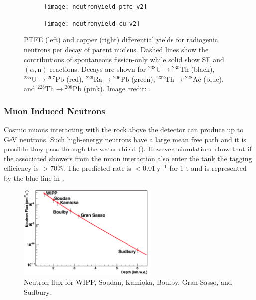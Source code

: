 \begin{figure}
    \centering
    \begin{subfigure}[t]{0.5\textwidth}
        \centering
        \texttt{[image: neutronyield-ptfe-v2]}
    \end{subfigure}%
    \begin{subfigure}[t]{0.5\textwidth}
        \centering
        \texttt{[image: neutronyield-cu-v2]}
    \end{subfigure}
    \caption{PTFE (left) and copper (right) differential yields for radiogenic neutrons per decay of parent nucleus.  Dashed lines show
    the contributions of spontaneous fission-only while solid show SF and $(\alpha, \mathrm{n})$ reactions.  Decays are shown
    for $\mathrm{^{238}U} \rightarrow \mathrm{^{230}Th}$ (black), $\mathrm{^{235}U} \rightarrow \mathrm{^{207}Pb}$ (red),
    $\mathrm{^{226}Ra} \rightarrow \mathrm{^{206}Pb}$ (green), $\mathrm{^{232}Th} \rightarrow \mathrm{^{228}Ac}$ (blue), and
    $\mathrm{^{228}Th} \rightarrow \mathrm{^{208}Pb}$ (pink).  Image credit: .}
	\label{fig:backgrounds_nuclear_radiogenic_rates}
\end{figure}



\subsubsection{Muon Induced Neutrons}
\label{subsubsec:backgrounds_nuclear_muon_induced}
Cosmic muons interacting with the rock above the detector can produce up to GeV neutrons.  Such high-energy neutrons have a large mean
free path and it is possible they pass through the water shield ().  However, simulations show that
if the associated showers from the muon interaction also enter the tank the tagging efficiency is $> 70\%$.  The predicted rate is
$< 0.01\ \mathrm{y^{-1}}$ for 1 t and is represented by the blue line in .

\begin{figure}
\centering
\includegraphics[width=0.6\textwidth]{MuonFluxOverDepth}
\caption{Neutron flux for WIPP, Soudan, Kamioka, Boulby, Gran Sasso, and Sudbury.}
\label{fig:backgrounds_nuclear_muon_induced_flux}
\end{figure}

